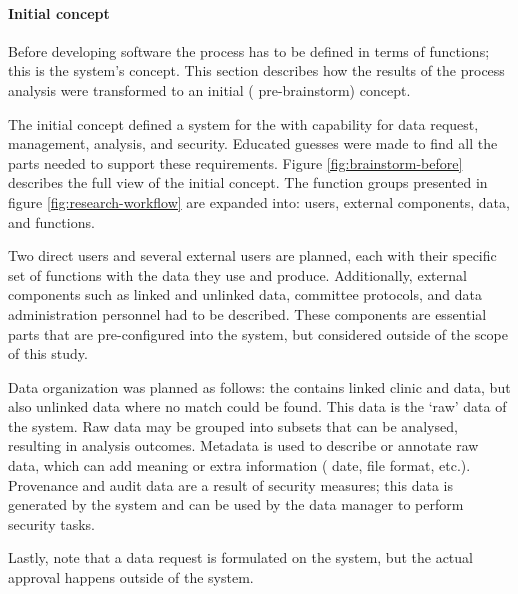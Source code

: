 \paragraph{Initial concept}
Before developing software the process has to be defined in terms of functions; this is the system's concept.
This section describes how the results of the process analysis were transformed to an initial (\ie{} pre-brainstorm) concept.

The initial concept defined a system for the \projectdata{} with capability for data request, management, analysis, and security.
Educated guesses were made to find all the parts needed to support these requirements.
Figure \ref{fig:brainstorm-before} describes the full view of the initial concept. 
The function groups presented in figure \ref{fig:research-workflow} are expanded into: users, external components, data, and functions.

Two direct users and several external users are planned, each with their specific set of functions with the data they use and produce.
Additionally, external components such as linked and unlinked data, committee protocols, and data administration personnel had to be described.
These components are essential parts that are pre-configured into the system, but considered outside of the scope of this study.

Data organization was planned as follows: the \projectdata{} contains linked clinic and \PRN{} data, but also unlinked data where no match could be found.
This data is the `raw' data of the system.
Raw data may be grouped into subsets that can be analysed, resulting in analysis outcomes.
Metadata is used to describe or annotate raw data, which can add meaning or extra information (\eg{} date, file format, etc.).
Provenance and audit data are a result of security measures; this data is generated by the system and can be used by the data manager to perform security tasks.

Lastly, note that a data request is formulated on the system, but the actual approval happens outside of the system.

